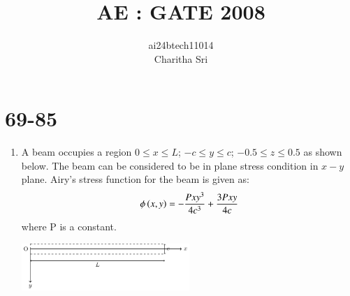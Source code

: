 \documentclass[journal,12pt,onecolumn]{IEEEtran}
\theoremstyle{remark}
\begin{document}

\vspace{3cm}

\title{AE : GATE 2008}
\author{ai24btech11014 \\ Charitha Sri}

\maketitle
\bigskip       
\renewcommand{\thefigure}{\theenumi}
\renewcommand{\thetable}{\theenumi}

\section{ 69-85}

\begin{enumerate}
\item A beam occupies a region $0\leq x \leq L$; $-c \leq y \leq c$; $ -0.5 \leq z \leq 0.5 $ as shown below. The beam can be considered to be in plane stress condition in $x-y$ plane. Airy's stress function for the beam is given as:
      \begin{align}
      \phi \left(x, y\right) = -\frac{Px{y}^3}{4{c}^3}+\frac{3Pxy}{4c}
      \end{align}
      where P is a constant.


\begin{center}
	\includegraphics[width=0.5\textwidth]{figs/fig1/fig1.pdf}
\end{center}


\end{enumerate}
\end{document}
